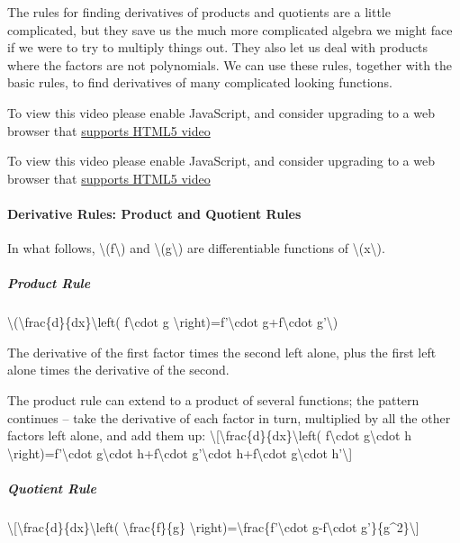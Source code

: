 The rules for finding derivatives of products and quotients are a little
complicated, but they save us the much more complicated algebra we might
face if we were to try to multiply things out. They also let us deal
with products where the factors are not polynomials. We can use these
rules, together with the basic rules, to find derivatives of many
complicated looking functions.

To view this video please enable JavaScript, and consider upgrading to a
web browser that \href{http://videojs.com/html5-video-support/}{supports
HTML5 video}

To view this video please enable JavaScript, and consider upgrading to a
web browser that \href{http://videojs.com/html5-video-support/}{supports
HTML5 video}

\hypertarget{derivative-rules-product-and-quotient-rules}{%
\paragraph{Derivative Rules: Product and Quotient
Rules}\label{derivative-rules-product-and-quotient-rules}}

In what follows, \textbackslash{}(f\textbackslash{}) and
\textbackslash{}(g\textbackslash{}) are differentiable functions of
\textbackslash{}(x\textbackslash{}).

\hypertarget{product-rule}{%
\subparagraph{Product Rule}\label{product-rule}}

\textbackslash{}(\textbackslash{}frac\{d\}\{dx\}\textbackslash{}left(
f\textbackslash{}cdot g \textbackslash{}right)=f'\textbackslash{}cdot
g+f\textbackslash{}cdot g'\textbackslash{})

The derivative of the first factor times the second left alone, plus the
first left alone times the derivative of the second.

The product rule can extend to a product of several functions; the
pattern continues -- take the derivative of each factor in turn,
multiplied by all the other factors left alone, and add them up:
\textbackslash{}{[}\textbackslash{}frac\{d\}\{dx\}\textbackslash{}left(
f\textbackslash{}cdot g\textbackslash{}cdot h
\textbackslash{}right)=f'\textbackslash{}cdot g\textbackslash{}cdot
h+f\textbackslash{}cdot g'\textbackslash{}cdot h+f\textbackslash{}cdot
g\textbackslash{}cdot h'\textbackslash{}{]}

\hypertarget{quotient-rule}{%
\subparagraph{Quotient Rule}\label{quotient-rule}}

\textbackslash{}{[}\textbackslash{}frac\{d\}\{dx\}\textbackslash{}left(
\textbackslash{}frac\{f\}\{g\}
\textbackslash{}right)=\textbackslash{}frac\{f'\textbackslash{}cdot
g-f\textbackslash{}cdot g'\}\{g\^{}2\}\textbackslash{}{]}

